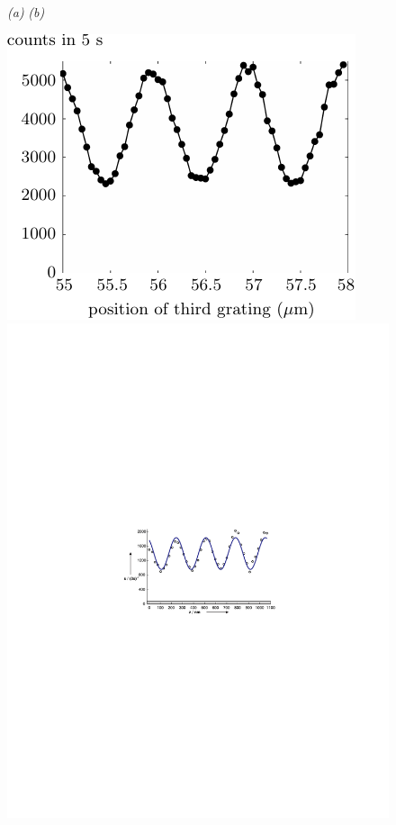 \documentclass[3p,sort&compress,12pt]{elsarticle}
\begin{document}
\begin{figure}
{\footnotesize \hspace{.4cm} \emph{(a)} \hspace{6.7cm} \emph{(b)} }

\vspace{.2cm}

\centering
\includegraphics[scale=0.9]{c70pat.pdf} \hspace{.8cm} \includegraphics[scale=.9]{tp.pdf}

\end{figure}
\end{document}
